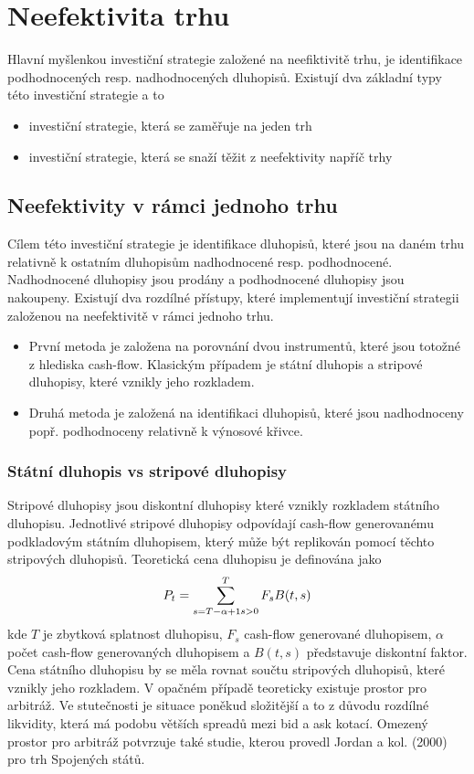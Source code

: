 \documentclass[a4paper]{book}
\begin{document}
\section{Neefektivita trhu}

Hlavní myšlenkou investiční strategie založené na neefiktivitě trhu, je identifikace podhodnocených resp. nadhodnocených dluhopisů. Existují dva základní typy této investiční strategie a to
\begin{itemize}
\item investiční strategie, která se zaměřuje na jeden trh
\item investiční strategie, která se snaží těžit z neefektivity napříč trhy
\end{itemize}

\subsection{Neefektivity v rámci jednoho trhu}

Cílem této investiční strategie je identifikace dluhopisů, které jsou na daném trhu relativně k ostatním dluhopisům nadhodnocené resp. podhodnocené. Nadhodnocené dluhopisy jsou prodány a podhodnocené dluhopisy jsou nakoupeny. Existují dva rozdílné přístupy, které implementují investiční strategii založenou na neefektivitě v rámci jednoho trhu.
\begin{itemize}
\item První metoda je založena na porovnání dvou instrumentů, které jsou totožné z hlediska cash-flow. Klasickým případem je státní dluhopis a stripové dluhopisy, které vznikly jeho rozkladem.
\item Druhá metoda je založená na identifikaci dluhopisů, které jsou nadhodnoceny popř. podhodnoceny relativně k výnosové křivce.
\end{itemize}

\subsubsection{Státní dluhopis vs stripové dluhopisy}

Stripové dluhopisy jsou diskontní dluhopisy které vznikly rozkladem státního dluhopisu. Jednotlivé stripové dluhopisy odpovídají cash-flow generovanému podkladovým státním dluhopisem, který může být replikován pomocí těchto stripových dluhopisů. Teoretická cena dluhopisu je definována jako
\begin{equation}
P_t = \sum_{\substack{s = T - \alpha + 1} \\ s > 0}^T F_s B(t,s)
\end{equation}
kde $T$ je zbytková splatnost dluhopisu, $F_s$ cash-flow generované dluhopisem, $\alpha$ počet cash-flow generovaných dluhopisem a $B(t,s)$ představuje diskontní faktor. Cena státního dluhopisu by se měla rovnat součtu stripových dluhopisů, které vznikly jeho rozkladem. V opačném případě teoreticky existuje prostor pro arbitráž. Ve stutečnosti je situace poněkud složitější a to z důvodu rozdílné likvidity, která má podobu větších spreadů mezi bid a ask kotací. Omezený prostor pro arbitráž potvrzuje také studie, kterou provedl Jordan a kol. (2000) pro trh Spojených států.
\end{document}
